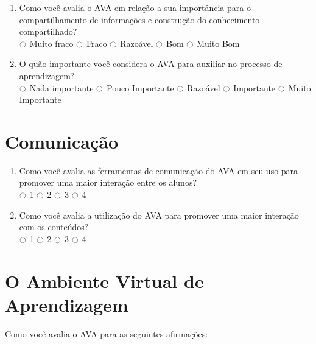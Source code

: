 \begin{enumerate}
\item Como você avalia o AVA em relação a sua importância para o compartilhamento de informações e construção do conhecimento compartilhado? \\ 
$\ocircle$ Muito fraco  $\ocircle$ Fraco $\ocircle$ Razoável $\ocircle$ Bom $\ocircle$ Muito Bom

\item O quão importante você considera o AVA para auxiliar no processo de aprendizagem? \\ 
$\ocircle$ Nada importante  $\ocircle$ Pouco Importante $\ocircle$ Razoável $\ocircle$ Importante $\ocircle$ Muito Importante

\end{enumerate}

\section{Comunicação}

\begin{enumerate}
  \item Como você avalia as ferramentas de comunicação do AVA em seu uso para promover uma maior interação entre os alunos? \\
  $\ocircle$ 1  $\ocircle$ 2 $\ocircle$ 3 $\ocircle$ 4

  \item Como você avalia a utilização do AVA para promover uma maior interação com os conteúdos? \\
  $\ocircle$ 1  $\ocircle$ 2 $\ocircle$ 3 $\ocircle$ 4
\end{enumerate}

\section{O Ambiente Virtual de Aprendizagem}

\noindent
Como você avalia o AVA para as seguintes afirmações:\\

